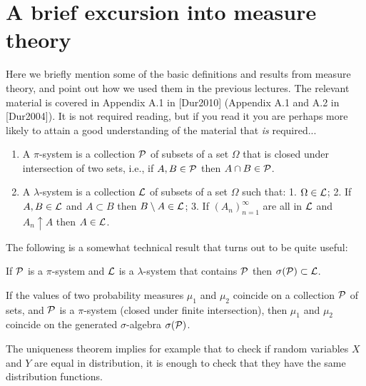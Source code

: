 \chapter{A brief excursion into measure theory}

Here we briefly mention some of the basic definitions
and results from measure theory, and point out how we
used them in the previous lectures. The relevant
material is covered in Appendix A.1 in [Dur2010]
(Appendix A.1 and A.2 in [Dur2004]). It is not
required reading, but if you read it you are perhaps
more likely to attain a good understanding of the
material that \emph{is} required...

\begin{defn}

\begin{enumerate}[label=(\roman*)]
\item A $\pi$-system is a collection ${\cal P}$ of subsets
of a set $\Omega$ that is closed under intersection
of two sets, i.e., if $A,B\in {\cal P}$ then
$A\cap B\in {\cal P}$.

\item A $\lambda$-system is a collection ${\cal L}$ of
subsets of a set $\Omega$ such that: 1.
$\Omega \in {\cal L}$; 2. If $A,B\in {\cal L}$ and
$A\subset B$ then $B\setminus A\in {\cal L}$; 3. If
$(A_n)_{n=1}^\infty$ are all in ${\cal L}$ and
$A_n \uparrow A$ then $A\in {\cal L}$.
\end{enumerate}

\end{defn}

\noindent The following is a somewhat technical result that
turns out to be quite useful:

\begin{thm}
If ${\cal P}$ is a $\pi$-system and ${\cal L}$ is a
$\lambda$-system that contains ${\cal P}$ then
$\sigma({\cal P}) \subset {\cal L}$.
\end{thm}

\begin{lem}
If the values of two probability measures $\mu_1$ and
$\mu_2$ coincide on a collection ${\cal P}$ of sets,
and ${\cal P}$ is a $\pi$-system (closed under finite
intersection), then $\mu_1$ and $\mu_2$ coincide on
the generated $\sigma$-algebra $\sigma({\cal P})$.
\end{lem}

\noindent The uniqueness theorem implies for example that to
check if random variables $X$ and $Y$ are equal in
distribution, it is enough to check that they have the
same distribution functions.


